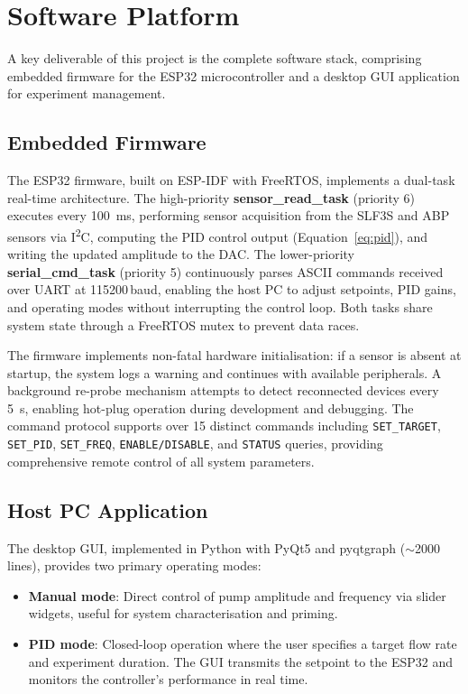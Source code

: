\section{Software Platform}

A key deliverable of this project is the complete software stack, comprising embedded firmware for the ESP32 microcontroller and a desktop GUI application for experiment management.

\subsection{Embedded Firmware}

The ESP32 firmware, built on ESP-IDF with FreeRTOS, implements a dual-task real-time architecture. The high-priority \textbf{sensor\_read\_task} (priority 6) executes every \SI{100}{\milli\second}, performing sensor acquisition from the SLF3S and ABP sensors via I\textsuperscript{2}C, computing the PID control output (Equation~\ref{eq:pid}), and writing the updated amplitude to the DAC. The lower-priority \textbf{serial\_cmd\_task} (priority 5) continuously parses ASCII commands received over UART at 115200\,baud, enabling the host PC to adjust setpoints, PID gains, and operating modes without interrupting the control loop. Both tasks share system state through a FreeRTOS mutex to prevent data races.

The firmware implements non-fatal hardware initialisation: if a sensor is absent at startup, the system logs a warning and continues with available peripherals. A background re-probe mechanism attempts to detect reconnected devices every \SI{5}{\second}, enabling hot-plug operation during development and debugging. The command protocol supports over 15 distinct commands including \texttt{SET\_TARGET}, \texttt{SET\_PID}, \texttt{SET\_FREQ}, \texttt{ENABLE/DISABLE}, and \texttt{STATUS} queries, providing comprehensive remote control of all system parameters.

\subsection{Host PC Application}

The desktop GUI, implemented in Python with PyQt5 and pyqtgraph (${\sim}$2000 lines), provides two primary operating modes:

\begin{itemize}
    \item \textbf{Manual mode}: Direct control of pump amplitude and frequency via slider widgets, useful for system characterisation and priming.
    \item \textbf{PID mode}: Closed-loop operation where the user specifies a target flow rate and experiment duration. The GUI transmits the setpoint to the ESP32 and monitors the controller's performance in real time.
\end{itemize}

